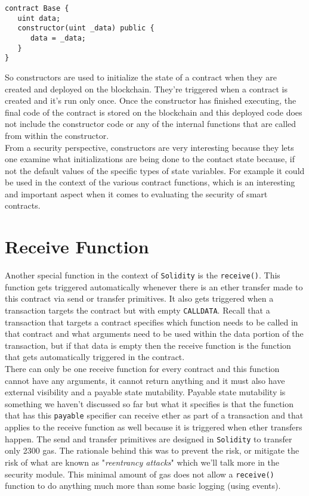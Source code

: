 \begin{lstlisting}[language=Solidity, style=solStyle, caption={Example of usage of a constructor}]
contract Base {
   uint data;
   constructor(uint _data) public {
      data = _data;   
   }
}
\end{lstlisting}

So constructors are used to initialize the state of a contract when they are created and deployed on the blockchain. They're triggered when a contract is created and it's run only once. Once the constructor has finished executing, the final code of the contract is stored on the blockchain and this deployed code does not include the constructor code or any of the internal functions that are called from within the constructor.\\

From a security perspective, constructors are very interesting because they lets one examine what initializations are being done to the contact state because, if not the default values of the specific types of state variables. For example it could be used in the context of the various contract functions, which is an interesting and important aspect when it comes to evaluating the security of smart contracts.

\section{Receive Function}
Another special function in the context of \texttt{Solidity} is the \texttt{receive()}. This function gets triggered automatically whenever there is an ether transfer made to this contract via send or transfer primitives. It also gets triggered when a transaction targets the contract but with empty \texttt{CALLDATA}. Recall that a transaction that targets a contract specifies which function needs to be called in that contract and what arguments need to be used within the data portion of the transaction, but if that data is empty then the receive function is the function that gets automatically triggered in the contract.\\

There can only be one receive function for every contract and this function cannot have any arguments, it cannot return anything and it must also have external visibility and a payable state mutability. Payable state mutability is something we haven't discussed so far but what it specifies is that the function that has this \texttt{payable} specifier can receive ether as part of a transaction and that applies to the receive function as well because it is triggered when ether transfers happen. The send and transfer primitives are designed in \texttt{Solidity} to transfer only 2300 gas. The rationale behind this was to prevent the risk, or mitigate the risk of what are known as "\textit{reentrancy attacks}" which we'll talk more in the security module. This minimal amount of gas does not allow a \texttt{receive()} function to do anything much more than some basic logging (using events).\\

